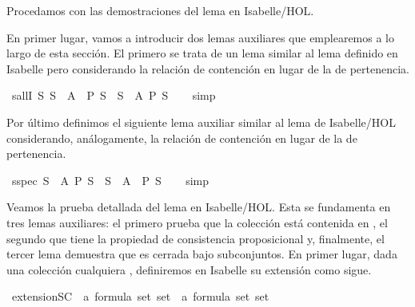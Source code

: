\begin{isabellebody}
\begin{isamarkuptext}
  Procedamos con las demostraciones del lema en Isabelle/HOL.

  En primer lugar, vamos a introducir dos lemas auxiliares que emplearemos a lo largo de
  esta sección. El primero se trata de un lema similar al lema  definido en Isabelle pero 
  considerando la relación de contención en lugar de la de pertenencia.%
\end{isamarkuptext}\isamarkuptrue%
\isamarkupfalse%
\ sallI{\isacharcolon}\ {\isachardoublequoteopen}{\isacharparenleft}{\isasymAnd}S{\isachardot}\ S\ {\isasymsubseteq}\ A\ {\isasymLongrightarrow}\ P\ S{\isacharparenright}\ {\isasymLongrightarrow}\ {\isasymforall}S\ {\isasymsubseteq}\ A{\isachardot}\ P\ S{\isachardoublequoteclose}\isanewline
%
\isadelimproof
\ \ %
\endisadelimproof
%
\isatagproof
{}\isamarkupfalse%
\ simp%
\endisatagproof
{\isafoldproof}%
%
\isadelimproof
%
\endisadelimproof
%
\begin{isamarkuptext}%
Por último definimos el siguiente lema auxiliar similar al lema  de Isabelle/HOL
  considerando, análogamente, la relación de contención en lugar de la de pertenencia.%
\end{isamarkuptext}\isamarkuptrue%
\isamarkupfalse%
\ sspec{\isacharcolon}\ {\isachardoublequoteopen}{\isasymforall}S\ {\isasymsubseteq}\ A{\isachardot}\ P\ S\ {\isasymLongrightarrow}\ S\ {\isasymsubseteq}\ A\ {\isasymLongrightarrow}\ P\ S{\isachardoublequoteclose}\isanewline
%
\isadelimproof
\ \ %
\endisadelimproof
%
\isatagproof
{}\isamarkupfalse%
\ simp%
\endisatagproof
{\isafoldproof}%
%
\isadelimproof
%
\endisadelimproof
%
\begin{isamarkuptext}%
Veamos la prueba detallada del lema en Isabelle/HOL. Esta se fundamenta en tres lemas
  auxiliares: el primero prueba que la colección  está contenida en , el segundo que
   tiene la propiedad de consistencia proposicional y, finalmente, el tercer lema demuestra que
   es cerrada bajo subconjuntos. En primer lugar, dada una colección cualquiera , definiremos 
  en Isabelle su extensión  como sigue.%
\end{isamarkuptext}\isamarkuptrue%
\isamarkupfalse%
\ extensionSC\ {\isacharcolon}{\isacharcolon}\ {\isachardoublequoteopen}{\isacharparenleft}{\isacharparenleft}{\isacharprime}a\ formula{\isacharparenright}\ set{\isacharparenright}\ set\ {\isasymRightarrow}\ {\isacharparenleft}{\isacharparenleft}{\isacharprime}a\ formula{\isacharparenright}\ set{\isacharparenright}\ set{\isachardoublequoteclose}\isanewline

\end{isabellebody}
